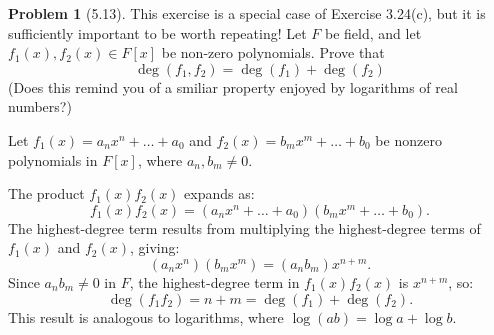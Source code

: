 \documentclass[12pt]{article}
\theoremstyle{definition}
\newtheorem{problem}{Problem}
\begin{document}
\begin{problem}[5.13]
    This exercise is a special case of Exercise 3.24(c), but it is sufficiently important to be worth repeating!
    Let $F$ be field, and let $f_1(x), f_2(x) \in F[x]$ be non-zero polynomials. Prove that
    \[
        \deg(f_1, f_2) = \deg(f_1) + \deg(f_2)
    \]
    (Does this remind you of a smiliar property enjoyed by logarithms of real numbers?)

    \begin{solution}
        Let $f_1(x) = a_n x^n + \dots + a_0$ and $f_2(x) = b_m x^m + \dots + b_0$ be nonzero polynomials in $F[x]$, where $a_n, b_m \neq 0$.
    
        The product $f_1(x) f_2(x)$ expands as:
        \[
        f_1(x) f_2(x) = (a_n x^n + \dots + a_0)(b_m x^m + \dots + b_0).
        \]
        The highest-degree term results from multiplying the highest-degree terms of $f_1(x)$ and $f_2(x)$, giving:
        \[
        (a_n x^n)(b_m x^m) = (a_n b_m) x^{n+m}.
        \]
        Since $a_n b_m \neq 0$ in $F$, the highest-degree term in $f_1(x) f_2(x)$ is $x^{n+m}$, so:
        \[
        \deg(f_1 f_2) = n + m = \deg(f_1) + \deg(f_2).
        \]
        This result is analogous to logarithms, where $\log(ab) = \log a + \log b$.
    
    \end{solution}
\end{problem}
\end{document}
